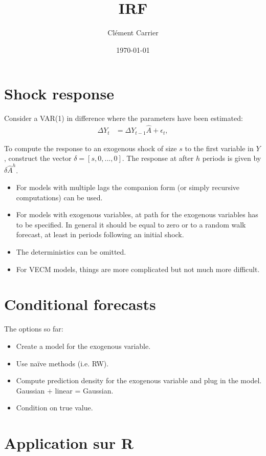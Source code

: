 \documentclass[11pt,oneside, a4paper]{amsart}\usepackage[]{graphicx}\usepackage[]{color}
\begin{document}
  
\title{IRF}   
\author{Clément Carrier}
\date{\today}
\maketitle


\section*{Shock response}

Consider a VAR(1) in difference where the parameters have been estimated:
\begin{align}
\Delta Y_t &= \Delta Y_{t-1} \hat A + \epsilon_t,\nonumber
\end{align}

To compute the response to an exogenous shock of size $s$ to the first variable in $Y$, construct the vector $\delta =[s,0,...,0]$. The response at after $h$ periods is given by $\delta \hat A^h$. 
\begin{itemize}
\item For models with multiple lags the companion form (or simply recursive computations) can be used.
\item For models with exogenous variables, at path for the exogenous variables has to be specified. In general it should be equal to zero or to a random walk forecast, at least in periods following an initial shock. 
\item The deterministics can be omitted. 
\item For VECM models, things are more complicated but not much more difficult.    
\end{itemize}


\section*{Conditional forecasts}

The options so far:
\begin{itemize}
\item Create a model for the exogenous variable. 
\item Use na\"{i}ve methods (i.e. RW).
\item Compute prediction density for the exogenous variable and plug in the model. Gaussian + linear = Gaussian.
\item Condition on true value. 
\end{itemize}



\section*{Application sur R}
\end{document}
